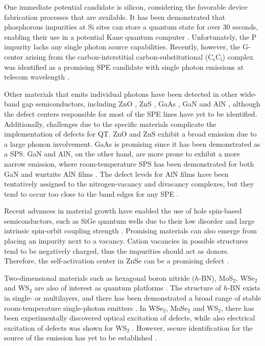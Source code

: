 One immediate potential candidate is silicon, considering the favorable device fabrication processes that are available. It has been demonstrated that phosphorous impurities at Si sites can store a quantum state for over $30$ seconds, enabling their use in a potential Kane quantum computer \cite{Kane1998, Zhang2020}. Unfortunately, the P impurity lacks any single photon source capabilities. Recently, however, the G-center arising from the carbon-interstitial carbon-substitutional ($\text{C}_{\text{s}}\text{C}_{\text{i}}$) complex was identified as a promising SPE candidate with single photon emissions at telecom wavelength \cite{Redjem2020}.

Other materials that emits individual photons have been detected in other wide-band gap semiconductors, including ZnO \cite{Zheng2014, Morfa2012}, ZnS \cite{Stewart2019}, GaAs \cite{Bluhm2010}, GaN \cite{Roux2017, Gammon1996} and AlN \cite{Chung2018, Wang2014}, although the defect centers responsible for most of the SPE lines have yet to be identified.
Additionally, challenges due to the specific materials complicate the implementation of defects for QT. ZnO and ZnS exhibit a broad emission due to a large phonon involvement. GaAs is promising since it has been demonstrated as a SPS.
GaN and AlN, on the other hand, are more prone to exhibit a more narrow emission, where room-temperature SPS has been demonstrated for both GaN \cite{Berhane2018} and wurtzite AlN films \cite{Xue2020}. The defect levels for AlN films have been tentatively assigned to the nitrogen-vacancy and divacancy complexes, but they tend to occur too close to the band edges for any SPE \cite{Zhang2020, Varley2016}.

Recent advances in material growth have enabled the use of hole spin-based semiconductors, such as SiGe quantum wells due to their low disorder and large intrinsic spin-orbit coupling strength \cite{Hardy2019}. Promising materials can also emerge from placing an impurity next to a vacancy. Cation vacancies in possible structures tend to be negatively charged, thus the impurities should act as donors. Therefore, the self-activation center in ZnSe can be a promising defect \cite{Weber2010}.

Two-dimensional materials such as hexagonal boron nitride ($h$-BN), MoS$_2$, WSe$_2$ and WS$_2$ are also of interest as quantum platforms \cite{Toth2019, Atatuere2018}. The structure of $h$-BN exists in single- or multilayers, and there has been demonstrated a broad range of stable room-temperature single-photon emitters \cite{Tran2016, Tran2016a}. In WSe$_2$, MoSe$_2$ and WS$_2$, there has been experimentally discovered optical excitation of defects, while also electrical excitation of defects was shown for WS$_2$ \cite{Atatuere2018}. However, secure identification for the source of the emission has yet to be established \cite{Weston2018, Abdi2018, Atatuere2018}.

